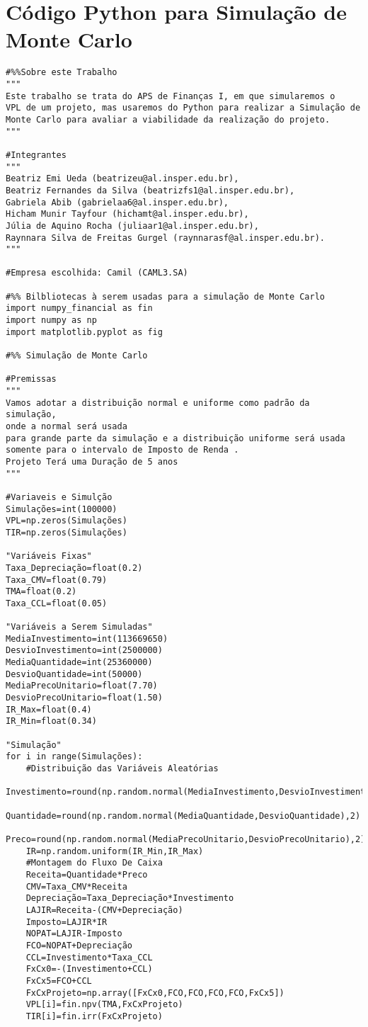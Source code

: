\documentclass[11pt]{article}
\begin{document}
\section{Código Python para Simulação de Monte Carlo}
\begin{verbatim}
#%%Sobre este Trabalho
"""
Este trabalho se trata do APS de Finanças I, em que simularemos o
VPL de um projeto, mas usaremos do Python para realizar a Simulação de
Monte Carlo para avaliar a viabilidade da realização do projeto.
"""

#Integrantes
"""
Beatriz Emi Ueda (beatrizeu@al.insper.edu.br),  
Beatriz Fernandes da Silva (beatrizfs1@al.insper.edu.br),  
Gabriela Abib (gabrielaa6@al.insper.edu.br),  
Hicham Munir Tayfour (hichamt@al.insper.edu.br),  
Júlia de Aquino Rocha (juliaar1@al.insper.edu.br),  
Raynnara Silva de Freitas Gurgel (raynnarasf@al.insper.edu.br).  
"""

#Empresa escolhida: Camil (CAML3.SA)

#%% Bilbliotecas à serem usadas para a simulação de Monte Carlo
import numpy_financial as fin
import numpy as np
import matplotlib.pyplot as fig

#%% Simulação de Monte Carlo

#Premissas
"""
Vamos adotar a distribuição normal e uniforme como padrão da simulação,
onde a normal será usada 
para grande parte da simulação e a distribuição uniforme será usada
somente para o intervalo de Imposto de Renda .
Projeto Terá uma Duração de 5 anos
"""

#Variaveis e Simulção
Simulações=int(100000)
VPL=np.zeros(Simulações)
TIR=np.zeros(Simulações)

"Variáveis Fixas"
Taxa_Depreciação=float(0.2)
Taxa_CMV=float(0.79)
TMA=float(0.2)
Taxa_CCL=float(0.05)

"Variáveis a Serem Simuladas"
MediaInvestimento=int(113669650)
DesvioInvestimento=int(2500000)
MediaQuantidade=int(25360000)
DesvioQuantidade=int(50000)
MediaPrecoUnitario=float(7.70)
DesvioPrecoUnitario=float(1.50)
IR_Max=float(0.4)
IR_Min=float(0.34)

"Simulação"
for i in range(Simulações):
    #Distribuição das Variáveis Aleatórias 
    Investimento=round(np.random.normal(MediaInvestimento,DesvioInvestimento),2)
    Quantidade=round(np.random.normal(MediaQuantidade,DesvioQuantidade),2)
    Preco=round(np.random.normal(MediaPrecoUnitario,DesvioPrecoUnitario),2)
    IR=np.random.uniform(IR_Min,IR_Max)
    #Montagem do Fluxo De Caixa 
    Receita=Quantidade*Preco
    CMV=Taxa_CMV*Receita
    Depreciação=Taxa_Depreciação*Investimento
    LAJIR=Receita-(CMV+Depreciação)
    Imposto=LAJIR*IR
    NOPAT=LAJIR-Imposto
    FCO=NOPAT+Depreciação
    CCL=Investimento*Taxa_CCL
    FxCx0=-(Investimento+CCL)
    FxCx5=FCO+CCL
    FxCxProjeto=np.array([FxCx0,FCO,FCO,FCO,FCO,FxCx5])
    VPL[i]=fin.npv(TMA,FxCxProjeto)
    TIR[i]=fin.irr(FxCxProjeto)


\end{verbatim}
\end{document}

